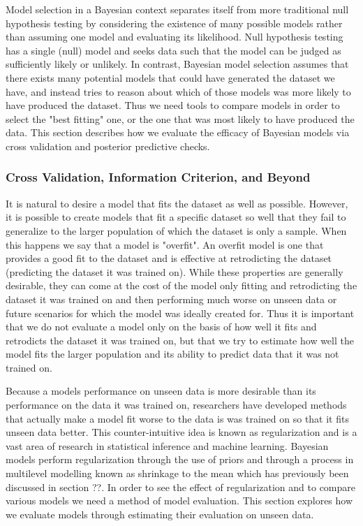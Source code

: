 Model selection in a Bayesian context separates itself from more traditional null hypothesis testing by considering the existence of many possible models rather than assuming one model and evaluating its likelihood. Null hypothesis testing has a single (null) model and seeks data such that the model can be judged as sufficiently likely or unlikely. In contrast, Bayesian model selection assumes that there exists many potential models that could have generated the dataset we have, and instead tries to reason about which of those models was more likely to have produced the dataset. Thus we need tools to compare models in order to select the "best fitting" one, or the one that was most likely to have produced the data. This section describes how we evaluate the efficacy of Bayesian models via cross validation and posterior predictive checks.

\subsubsection{Cross Validation, Information Criterion, and Beyond}
It is natural to desire a model that fits the dataset as well as possible. However, it is possible to create models that fit a specific dataset so well that they fail to generalize to the larger population of which the dataset is only a sample. When this happens we say that a model is "overfit". An overfit model is one that provides a good fit to the dataset and is effective at retrodicting the dataset (predicting the dataset it was trained on). While these properties are generally desirable, they can come at the cost of the model only fitting and retrodicting the dataset it was trained on and then performing much worse on unseen data or future scenarios for which the model was ideally created for. Thus it is important that we do not evaluate a model only on the basis of how well it fits and retrodicts the dataset it was trained on, but that we try to estimate how well the model fits the larger population and its ability to predict data that it was not trained on.

Because a models performance on unseen data is more desirable than its performance on the data it was trained on, researchers have developed methods that actually make a model fit worse to the data is was trained on so that it fits unseen data better. This counter-intuitive idea is known as regularization and is a vast area of research in statistical inference and machine learning. Bayesian models perform regularization through the use of priors and through a process in multilevel modelling known as shrinkage to the mean which has previously been discussed in section ??. In order to see the effect of regularization and to compare various models we need a method of model evaluation. This section explores how we evaluate models through estimating their evaluation on unseen data.


